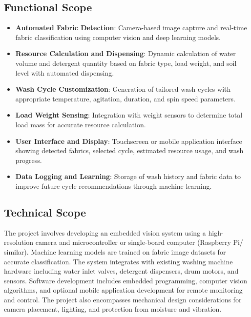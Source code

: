 \subsection{Functional Scope}
\begin{itemize}
    \item \textbf{Automated Fabric Detection}: Camera-based image capture and real-time fabric classification using computer vision and deep learning models.
    \item \textbf{Resource Calculation and Dispensing}: Dynamic calculation of water volume and detergent quantity based on fabric type, load weight, and soil level with automated dispensing.
    \item \textbf{Wash Cycle Customization}: Generation of tailored wash cycles with appropriate temperature, agitation, duration, and spin speed parameters.
    \item \textbf{Load Weight Sensing}: Integration with weight sensors to determine total load mass for accurate resource calculation.
    \item \textbf{User Interface and Display}: Touchscreen or mobile application interface showing detected fabrics, selected cycle, estimated resource usage, and wash progress.
    \item \textbf{Data Logging and Learning}: Storage of wash history and fabric data to improve future cycle recommendations through machine learning.
\end{itemize}

\subsection{Technical Scope}
The project involves developing an embedded vision system using a high-resolution camera and microcontroller or single-board computer (Raspberry Pi/ similar). Machine learning models are trained on fabric image datasets for accurate classification. The system integrates with existing washing machine hardware including water inlet valves, detergent dispensers, drum motors, and sensors. Software development includes embedded programming, computer vision algorithms, and optional mobile application development for remote monitoring and control. The project also encompasses mechanical design considerations for camera placement, lighting, and protection from moisture and vibration.